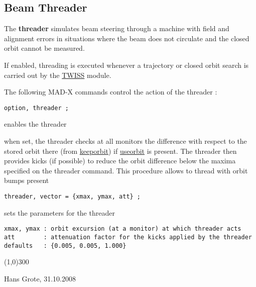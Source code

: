


\subsection{Beam Threader}  The \textbf{threader} simulates beam steering through a machine with field and alignment errors in situations where the beam does not circulate and the closed orbit cannot be measured. 

 If enabled, threading is executed whenever a trajectory or closed orbit search is carried out by the \href{../twiss/twiss.html}{TWISS} module. 

 The following MAD-X commands control the action of the threader :  


\begin{verbatim}
option, threader ;
\end{verbatim}  enables the threader 

 when set, the threader checks at all monitors the difference with respect to the stored orbit there (from \href{../twiss/twiss.html}{keeporbit}) if \href{../twiss/twiss.html}{useorbit} is present. The threader then provides kicks (if possible) to reduce the orbit difference below the maxima specified on the threader command. This procedure allows to thread with orbit bumps present  

\begin{verbatim}
threader, vector = {xmax, ymax, att} ;
\end{verbatim}  sets the parameters for the threader 
\begin{verbatim}
xmax, ymax : orbit excursion (at a monitor) at which threader acts
att        : attenuation factor for the kicks applied by the threader
defaults   : {0.005, 0.005, 1.000}
\end{verbatim}


\line(1,0){300}

 Hans Grote, 31.10.2008 

